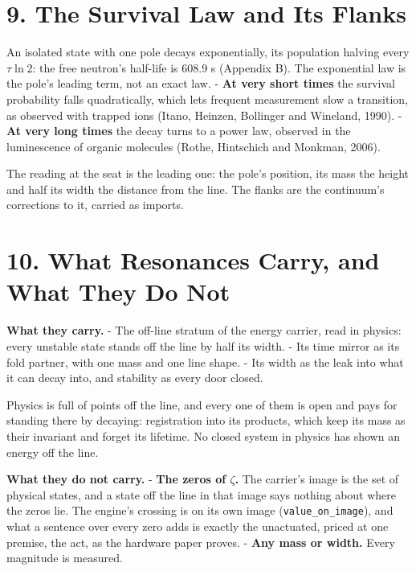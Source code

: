 \documentclass[10pt]{article}
\begin{document}
\hypertarget{the-survival-law-and-its-flanks}{%
\section{9. The Survival Law and Its
Flanks}\label{the-survival-law-and-its-flanks}}

An isolated state with one pole decays exponentially, its population
halving every \(\tau\ln2\): the free neutron's half-life is 608.9 s
(Appendix B). The exponential law is the pole's leading term, not an
exact law. - \textbf{At very short times} the survival probability falls
quadratically, which lets frequent measurement slow a transition, as
observed with trapped ions (Itano, Heinzen, Bollinger and Wineland,
1990). - \textbf{At very long times} the decay turns to a power law,
observed in the luminescence of organic molecules (Rothe, Hintschich and
Monkman, 2006).

The reading at the seat is the leading one: the pole's position, its
mass the height and half its width the distance from the line. The
flanks are the continuum's corrections to it, carried as imports.

\hypertarget{what-resonances-carry-and-what-they-do-not}{%
\section{10. What Resonances Carry, and What They Do
Not}\label{what-resonances-carry-and-what-they-do-not}}

\textbf{What they carry.} - The off-line stratum of the energy carrier,
read in physics: every unstable state stands off the line by half its
width. - Its time mirror as its fold partner, with one mass and one line
shape. - Its width as the leak into what it can decay into, and
stability as every door closed.

Physics is full of points off the line, and every one of them is open
and pays for standing there by decaying: registration into its products,
which keep its mass as their invariant and forget its lifetime. No
closed system in physics has shown an energy off the line.

\textbf{What they do not carry.} - \textbf{The zeros of \(\zeta\).} The
carrier's image is the set of physical states, and a state off the line
in that image says nothing about where the zeros lie. The engine's
crossing is on its own image (\texttt{value\_on\_image}), and what a
sentence over every zero adds is exactly the unactuated, priced at one
premise, the act, as the hardware paper proves. - \textbf{Any mass or
width.} Every magnitude is measured.
\end{document}

